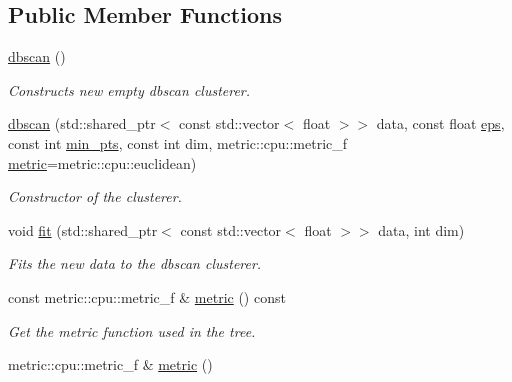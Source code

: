 \subsection*{Public Member Functions}
\begin{DoxyCompactItemize}
\item 
\hypertarget{classcluster_1_1cpu_1_1dbscan_ae865bc18bb646e845cfac1cddad77419}{}\hyperlink{classcluster_1_1cpu_1_1dbscan_ae865bc18bb646e845cfac1cddad77419}{dbscan} ()\label{classcluster_1_1cpu_1_1dbscan_ae865bc18bb646e845cfac1cddad77419}

\begin{DoxyCompactList}\small\item\em Constructs new empty dbscan clusterer. \end{DoxyCompactList}\item 
\hyperlink{classcluster_1_1cpu_1_1dbscan_a48d1156c8eb000f2ae8a916b31b2d492}{dbscan} (std\+::shared\+\_\+ptr$<$ const std\+::vector$<$ float $>$$>$ data, const float \hyperlink{classcluster_1_1dbscan_adffe3dee8aede13ce2068552a38e4bb9}{eps}, const int \hyperlink{classcluster_1_1dbscan_a5f424fb02ca1d736fb07f9e214a01a65}{min\+\_\+pts}, const int dim, metric\+::cpu\+::metric\+\_\+f \hyperlink{classcluster_1_1cpu_1_1dbscan_a6f78ac58ddffb6784a44669355e6e2a1}{metric}=metric\+::cpu\+::euclidean)
\begin{DoxyCompactList}\small\item\em Constructor of the clusterer. \end{DoxyCompactList}\item 
\hypertarget{classcluster_1_1cpu_1_1dbscan_a2a1aa76395f3537fe58221c2f07807be}{}void \hyperlink{classcluster_1_1cpu_1_1dbscan_a2a1aa76395f3537fe58221c2f07807be}{fit} (std\+::shared\+\_\+ptr$<$ const std\+::vector$<$ float $>$$>$ data, int dim)\label{classcluster_1_1cpu_1_1dbscan_a2a1aa76395f3537fe58221c2f07807be}

\begin{DoxyCompactList}\small\item\em Fits the new data to the dbscan clusterer. \end{DoxyCompactList}\item 
\hypertarget{classcluster_1_1cpu_1_1dbscan_a6f78ac58ddffb6784a44669355e6e2a1}{}const metric\+::cpu\+::metric\+\_\+f \& \hyperlink{classcluster_1_1cpu_1_1dbscan_a6f78ac58ddffb6784a44669355e6e2a1}{metric} () const \label{classcluster_1_1cpu_1_1dbscan_a6f78ac58ddffb6784a44669355e6e2a1}

\begin{DoxyCompactList}\small\item\em Get the metric function used in the tree. \end{DoxyCompactList}\item 
\hypertarget{classcluster_1_1cpu_1_1dbscan_a8ce5c3b6eef289672837ddb84c411cd7}{}metric\+::cpu\+::metric\+\_\+f \& \hyperlink{classcluster_1_1cpu_1_1dbscan_a8ce5c3b6eef289672837ddb84c411cd7}{metric} ()\label{classcluster_1_1cpu_1_1dbscan_a8ce5c3b6eef289672837ddb84c411cd7}


\end{DoxyCompactItemize}
